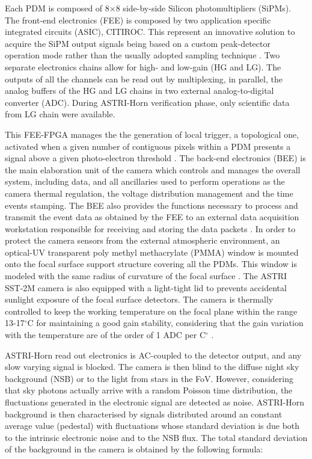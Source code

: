Each PDM is composed of 8$\times$8 side-by-side Silicon photomultipliers (SiPMs). The front-end electronics (FEE) is composed by two application specific integrated circuits (ASIC), CITIROC. This represent an innovative solution to acquire the SiPM output signals  being based on a custom peak-detector operation mode rather than the usually adopted sampling technique \citep{Sottile2016}. Two separate electronics chains allow for high- and low-gain (HG and LG). The outputs of all the channels can be read out by multiplexing, in parallel, the analog buffers of the HG and LG chains in two external analog-to-digital converter (ADC). During ASTRI-Horn verification phase, only scientific data from LG chain were available.


This FEE-FPGA manages the the generation of local trigger, a topological one, activated when a given number of contiguous pixels within a PDM presents a signal above a given photo-electron threshold \citep{Sottile2016}.
The back-end electronics (BEE) is the main elaboration unit of the camera which controls and manages the overall system, including data, and all ancillaries used to perform operations as
the camera thermal regulation, the voltage distribution management and the time events stamping.
The BEE also provides the functions necessary to process and transmit the event data as obtained by the FEE to an external data acquisition workstation responsible for receiving and storing the data packets \citep{Sottile2016}.
In order to protect the camera sensors from the external
atmospheric environment, an optical-UV transparent poly methyl methacrylate (PMMA)  window 
is mounted onto the focal surface support structure covering all the PDMs.
This window is modeled with the same radius of curvature of the focal surface \citep{Catalano2018}.
The ASTRI SST-2M camera is also equipped  with a light-tight lid to prevents accidental sunlight 
exposure of the focal surface detectors.
The camera is thermally controlled to keep the working temperature on the focal plane within the range 13-17$^\circ$C
for maintaining a good gain stability, considering that the gain variation with the temperature are of the order of 1 ADC per C$^\circ$ \citep{Impiombato2015}.


ASTRI-Horn read out electronics is AC-coupled to the detector output, and any slow varying signal is  blocked.
The camera is then blind to the diffuse night sky background (NSB) or to the light from stars in the FoV.   However, considering that sky photons actually arrive with a random Poisson time distribution, the fluctuations generated in the electronic signal are detected as noise. ASTRI-Horn  background is then characterised by signals distributed around an constant average value (pedestal) with fluctuations whose standard deviation is due both to the intrinsic electronic noise and to the NSB flux.  The total standard deviation of the background in the camera is obtained by the following formula:

